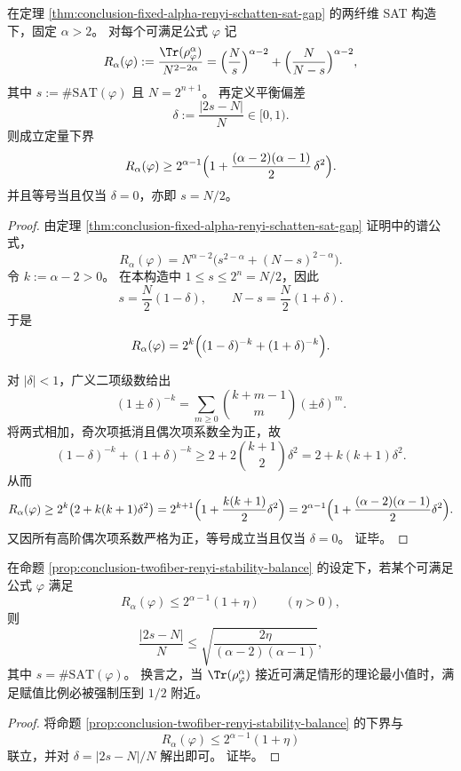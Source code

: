 \begin{proposition}\label{prop:conclusion-twofiber-renyi-stability-balance}
在定理 \ref{thm:conclusion-fixed-alpha-renyi-schatten-sat-gap} 的两纤维 SAT 构造下，固定 \(\alpha>2\)。
对每个可满足公式 \(\varphi\) 记
\[
R_\alpha(\varphi):=
\frac{\Tr(\rho_\varphi^\alpha)}{N^{2-2\alpha}}
=
\Bigl(\frac{N}{s}\Bigr)^{\alpha-2}
+
\Bigl(\frac{N}{N-s}\Bigr)^{\alpha-2},
\]
其中 \(s:=\#\mathrm{SAT}(\varphi)\) 且 \(N=2^{n+1}\)。
再定义平衡偏差
\[
\delta:=\frac{|2s-N|}{N}\in[0,1).
\]
则成立定量下界
\[
R_\alpha(\varphi)
\ge
2^{\alpha-1}\Bigl(1+\frac{(\alpha-2)(\alpha-1)}{2}\,\delta^2\Bigr).
\]
并且等号当且仅当 \(\delta=0\)，亦即 \(s=N/2\)。
\end{proposition}
\begin{proof}
由定理 \ref{thm:conclusion-fixed-alpha-renyi-schatten-sat-gap} 证明中的谱公式，
\[
R_\alpha(\varphi)
=
N^{\alpha-2}\bigl(s^{2-\alpha}+(N-s)^{2-\alpha}\bigr).
\]
令 \(k:=\alpha-2>0\)。
在本构造中 \(1\le s\le 2^n=N/2\)，因此
\[
s=\frac{N}{2}(1-\delta),
\qquad
N-s=\frac{N}{2}(1+\delta).
\]
于是
\[
R_\alpha(\varphi)
=
2^k\Bigl((1-\delta)^{-k}+(1+\delta)^{-k}\Bigr).
\]

对 \(|\delta|<1\)，广义二项级数给出
\[
(1\pm\delta)^{-k}
=
\sum_{m\ge 0}\binom{k+m-1}{m}(\pm\delta)^m.
\]
将两式相加，奇次项抵消且偶次项系数全为正，故
\[
(1-\delta)^{-k}+(1+\delta)^{-k}
\ge
2+2\binom{k+1}{2}\delta^2
=
2+k(k+1)\delta^2.
\]
从而
\[
R_\alpha(\varphi)
\ge
2^k\bigl(2+k(k+1)\delta^2\bigr)
=
2^{k+1}\Bigl(1+\frac{k(k+1)}{2}\delta^2\Bigr)
=
2^{\alpha-1}\Bigl(1+\frac{(\alpha-2)(\alpha-1)}{2}\delta^2\Bigr).
\]
又因所有高阶偶次项系数严格为正，等号成立当且仅当 \(\delta=0\)。
证毕。
\end{proof}

\begin{corollary}\label{cor:conclusion-twofiber-renyi-balance-inversion}
在命题 \ref{prop:conclusion-twofiber-renyi-stability-balance} 的设定下，若某个可满足公式 \(\varphi\) 满足
\[
R_\alpha(\varphi)\le 2^{\alpha-1}(1+\eta)
\qquad(\eta>0),
\]
则
\[
\frac{|2s-N|}{N}
\le
\sqrt{\frac{2\eta}{(\alpha-2)(\alpha-1)}},
\]
其中 \(s=\#\mathrm{SAT}(\varphi)\)。
换言之，当 \(\Tr(\rho_\varphi^\alpha)\) 接近可满足情形的理论最小值时，满足赋值比例必被强制压到 \(1/2\) 附近。
\end{corollary}
\begin{proof}
将命题 \ref{prop:conclusion-twofiber-renyi-stability-balance} 的下界与
\[
R_\alpha(\varphi)\le 2^{\alpha-1}(1+\eta)
\]
联立，并对 \(\delta=|2s-N|/N\) 解出即可。
证毕。
\end{proof}

